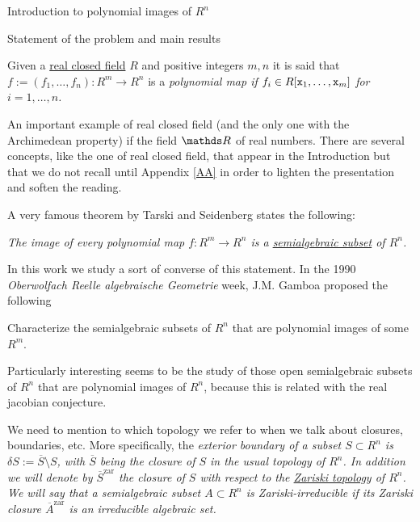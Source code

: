 \documentclass[11pt, a4paper, english, twoside, notitlepage, openright]{report}
\begin{document}
\tableofcontents
\thispagestyle{empty}

\begin{chapter}{Introduction to polynomial images of $R^n$}

\begin{section}{Statement of the problem and main results}
\begin{definition}\label{polyMap} Given a \hyperref[realCField]{real closed field} $R$ and positive integers $m,n$ it is said that $f:=(f_1,\dots,f_n):R^m\to R^n$ is a \em polynomial map \em if $f_i\in R[{\tt x}_1,\dots,{\tt x}_m]$ for $i=1,\dots,n$. 
\end{definition}

An important example of real closed field (and the only one with the Archimedean property) if the field $\R$ of real numbers. There are several concepts, like the one of real closed field, that appear in the Introduction but that we do not recall until Appendix \ref{AA} in order to lighten the presentation and soften the reading.
	
A very famous theorem by Tarski and Seidenberg states the following:
\begin{theorem}\label{tarskiSeidenberg} \em The image of every polynomial map $f: R^m \longrightarrow R^n$ is a \hyperref[semialgSet]{semialgebraic subset} of $R^n$. \em
\end{theorem}

In this work we study a sort of converse of this statement. In the 1990 \emph{Oberwolfach Reelle algebraische Geometrie} week, J.M. Gamboa \cite{g} proposed the following
\begin{problem}
Characterize the semialgebraic subsets of $R^n$ that are polynomial images of some $R^m$.
\end{problem}
Particularly interesting seems to be the study of those open semialgebraic subsets of $R^n$ that are polynomial images of $R^n$, because this is related with the real jacobian conjecture.
	
\begin{notation} We need to mention to which topology we refer to when we talk about closures, boundaries, etc. More specifically, the \em exterior boundary \em of a subset $S\subset R^n$ is $\delta S:=\overline{S}\setminus S$, with $\overline{S}$ being the \em closure \em of $S$ in the usual topology of $R^n$. In addition we will denote by $\overline{S}^{\text{zar}}$ the closure of $S$ with respect to the \hyperref[zariski]{Zariski topology} of $R^n$. We will say that a semialgebraic subset $A\subset R^n$ is \em Zariski-irreducible \em if its Zariski closure $\overline{A}^{\text{zar}}$ is an irreducible algebraic set.
\end{notation}
	

\end{section}
\end{chapter}
\end{document}
